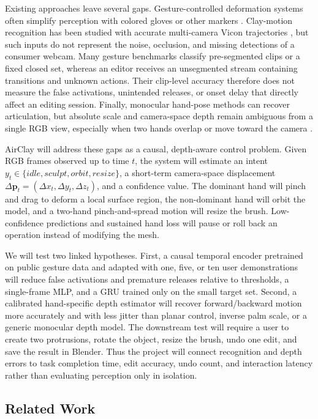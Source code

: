 \documentclass{article}
\begin{document}
Existing approaches leave several gaps. Gesture-controlled deformation systems
often simplify perception with colored gloves or other markers
\citep{mahdikhanlou2022deforming}. Clay-motion recognition has been studied
with accurate multi-camera Vicon trajectories \citep{veldhuijzen2024shrec}, but
such inputs do not represent the noise, occlusion, and missing detections of a
consumer webcam. Many gesture benchmarks classify pre-segmented clips or a
fixed closed set, whereas an editor receives an unsegmented stream containing
transitions and unknown actions. Their clip-level accuracy therefore does not
measure the false activations, unintended releases, or onset delay that directly
affect an editing session. Finally, monocular hand-pose methods can recover
articulation, but absolute scale and camera-space depth remain ambiguous from a
single RGB view, especially when two hands overlap or move toward the camera
\citep{huang2023nvf,yu2023acr}.

AirClay will address these gaps as a causal, depth-aware control problem. Given
RGB frames observed up to time $t$, the system will estimate an intent
$y_t \in \{\textit{idle},\textit{sculpt},\textit{orbit},\textit{resize}\}$,
a short-term camera-space displacement
$\Delta\mathbf{p}_t=(\Delta x_t,\Delta y_t,\Delta z_t)$, and a confidence value.
The dominant hand will pinch and drag to deform a local surface region, the
non-dominant hand will orbit the model, and a two-hand pinch-and-spread motion
will resize the brush. Low-confidence predictions and sustained hand loss will
pause or roll back an operation instead of modifying the mesh.

We will test two linked hypotheses. First, a causal temporal encoder pretrained
on public gesture data and adapted with one, five, or ten user demonstrations
will reduce false activations and premature releases relative to thresholds, a
single-frame MLP, and a GRU trained only on the small target set. Second, a
calibrated hand-specific depth estimator will recover forward/backward motion
more accurately and with less jitter than planar control, inverse palm scale,
or a generic monocular depth model. The downstream test will require a user to
create two protrusions, rotate the object, resize the brush, undo one edit, and
save the result in Blender. Thus the project will connect recognition and depth
errors to task completion time, edit accuracy, undo count, and interaction
latency rather than evaluating perception only in isolation.

\subsection{Related Work}
\end{document}

